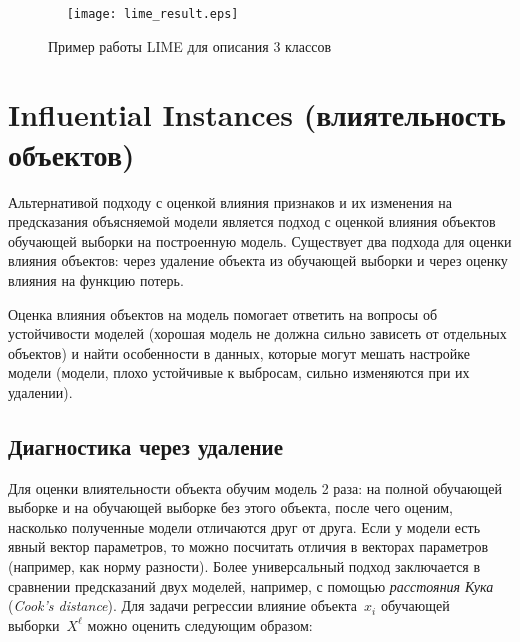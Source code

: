 \documentclass[12pt,a4paper]{article}
\begin{document}
\begin{center}
\begin{figure}[!htb]
 \centering
 \texttt{[image: lime\_result.eps]}
 \caption{Пример работы LIME для описания 3 классов}
\end{figure}
\end{center}

%


\section{Influential Instances (влиятельность объектов)}

Альтернативой подходу с оценкой влияния признаков и их изменения на предсказания объясняемой модели является подход с оценкой влияния объектов обучающей выборки на построенную модель. Существует два подхода для оценки влияния объектов: через удаление объекта из обучающей выборки и через оценку влияния на функцию потерь.

Оценка влияния объектов на модель помогает ответить на вопросы об устойчивости моделей (хорошая модель не должна сильно зависеть от отдельных объектов) и найти особенности в данных, которые могут мешать настройке модели (модели, плохо устойчивые к выбросам, сильно изменяются при их удалении).

\subsection{Диагностика через удаление}

Для оценки влиятельности объекта обучим модель 2 раза: на полной обучающей выборке и на обучающей выборке без этого объекта, после чего оценим, насколько полученные модели отличаются друг от друга. Если у модели есть явный вектор параметров, то можно посчитать отличия в векторах параметров (например, как норму разности). Более универсальный подход заключается в сравнении предсказаний двух моделей, например, с помощью \emph{расстояния Кука} (\emph{Cook's distance}). Для задачи регрессии влияние объекта~$x_i$ обучающей выборки~$X^\ell$ можно оценить следующим образом:
\end{document}
